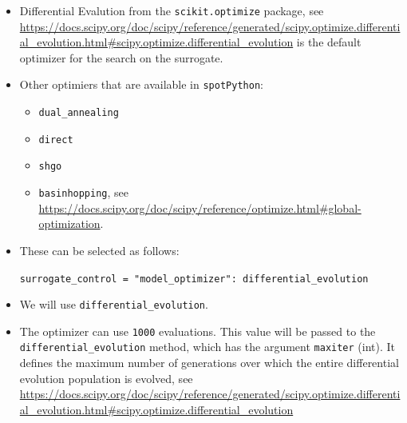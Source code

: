 \documentclass[
  letterpaper,
  DIV=11,
  numbers=noendperiod]{scrreprt}
\providecommand{\tightlist}{%
  \setlength{\itemsep}{0pt}\setlength{\parskip}{0pt}}\usepackage{longtable,booktabs,array}
\begin{document}
\begin{itemize}
\item
  Differential Evalution from the \texttt{scikit.optimize} package, see
  \url{https://docs.scipy.org/doc/scipy/reference/generated/scipy.optimize.differential_evolution.html\#scipy.optimize.differential_evolution}
  is the default optimizer for the search on the surrogate.
\item
  Other optimiers that are available in \texttt{spotPython}:

  \begin{itemize}
  \tightlist
  \item
    \texttt{dual\_annealing}
  \item
    \texttt{direct}
  \item
    \texttt{shgo}
  \item
    \texttt{basinhopping}, see
    \url{https://docs.scipy.org/doc/scipy/reference/optimize.html\#global-optimization}.
  \end{itemize}
\item
  These can be selected as follows:

  \texttt{surrogate\_control\ =\ "model\_optimizer":\ differential\_evolution}
\item
  We will use \texttt{differential\_evolution}.
\item
  The optimizer can use \texttt{1000} evaluations. This value will be
  passed to the \texttt{differential\_evolution} method, which has the
  argument \texttt{maxiter} (int). It defines the maximum number of
  generations over which the entire differential evolution population is
  evolved, see
  \url{https://docs.scipy.org/doc/scipy/reference/generated/scipy.optimize.differential_evolution.html\#scipy.optimize.differential_evolution}
\end{itemize}
\end{document}
